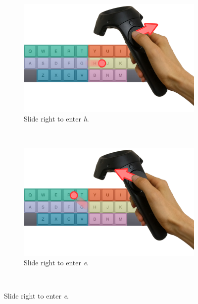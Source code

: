 \begin{figure}
  \centering
  \begin{subfigure}{.6\columnwidth}
  \includegraphics[width=\textwidth]{figures/right}
  \caption{Slide right to enter \textit{h}. }
  \label{fig:controllerVive}
  \end{subfigure}
  \\
  \begin{subfigure}{.6\columnwidth}
  \includegraphics[width=\textwidth]{figures/upperLeft}
  \caption{Slide right to enter \textit{e}. }
  \label{fig:controllerVive}
  \end{subfigure}
  \\
  


\end{figure}
